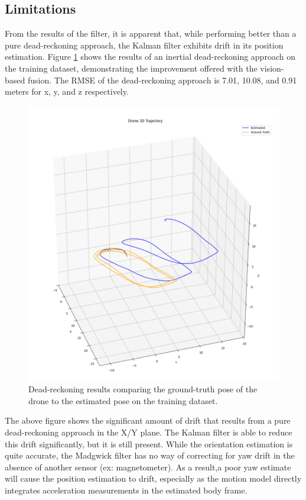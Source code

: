 \documentclass[bare_jrnl_transmag]{subfiles}
\begin{document}
\subsection{Limitations}
From the results of the filter, it is apparent that, while performing better than a pure dead-reckoning approach, the Kalman filter exhibits drift in its position estimation. Figure \ref{fig:dead_reackoning} shows the results of an inertial dead-reckoning approach on the training dataset, demonstrating the improvement offered with the vision-based fusion. The RMSE of the dead-reckoning approach is 7.01, 10.08, and 0.91 meters for x, y, and z respectively.

\begin{figure}[H]
    \centering
    \includegraphics[width=0.8\linewidth]{figures/dead_reckoning_results_training.png}
    \caption{Dead-reckoning results comparing the ground-truth pose of the drone to the estimated pose on the training dataset.}
    \label{fig:dead_reackoning}
\end{figure}

The above figure shows the significant amount of drift that results from a pure dead-reckoning approach in the X/Y plane. The Kalman filter is able to reduce this drift significantly, but it is still present. While the orientation estimation is quite accurate, the Madgwick filter has no way of correcting for yaw drift in the absence of another sensor (ex: magnetometer). As a result,a poor yaw estimate will cause the position estimation to drift, especially as the motion model directly integrates acceleration measurements in the estimated body frame. 
\end{document}
